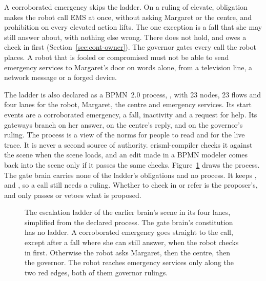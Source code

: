 A corroborated emergency skips the ladder. On a ruling of elevate, obligation  makes the
robot call EMS at once, without asking Margaret or the centre, and prohibition  on every
elevated action lifts. The one exception is a fall that she may still answer about, with nothing
else wrong. There  does not hold, and  owes a check in first
(Section~\ref{sec:cont-owner}). The governor gates every call the robot places. A robot that is fooled or
compromised must not be able to send emergency services to Margaret's door on words alone, from a
television line, a network message or a forged device.

The ladder is also declared as a BPMN~2.0 process, , with 23 nodes, 23 flows
and four lanes for the robot, Margaret, the centre and emergency services. Its start events are a
corroborated emergency, a fall, inactivity and a request for help. Its gateways branch on her answer,
on the centre's reply, and on the governor's ruling. The process is a view of the norms for people to
read and for the live trace. It is never a second source of authority. erisml-compiler checks it
against the scene when the scene loads, and an edit made in a BPMN modeler comes back into the scene
only if it passes the same checks. Figure~\ref{fig:ladder} draws the process. The gate
brain carries none of the ladder's obligations and no process. It keeps ,  and
, so a call still needs a ruling. Whether to check in or refer is the proposer's, and
\deme{} only passes or vetoes what is proposed.

\begin{figure}[t]
\centering

\caption{The escalation ladder of the earlier brain's scene in its four lanes, simplified from the
declared process. The gate brain's constitution has no ladder. A
corroborated emergency goes straight to the call, except after a fall where she can still answer,
when the robot checks in first. Otherwise the robot asks Margaret, then the
centre, then the governor. The robot reaches emergency services only along the two red edges, both
of them governor rulings.}
\label{fig:ladder}
\end{figure}

